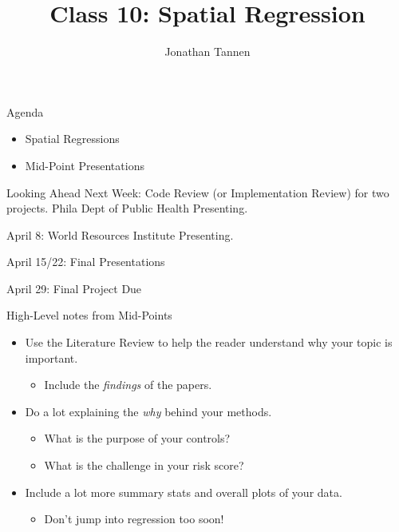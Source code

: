 \documentclass[
  8pt,
  ignorenonframetext,
]{beamer}
\title{Class 10: Spatial Regression}
\author{Jonathan Tannen}
\date{}
\providecommand{\tightlist}{%
  \setlength{\itemsep}{0pt}\setlength{\parskip}{0pt}}
\begin{document}
\frame{\titlepage}

\begin{frame}{Agenda}
\protect\hypertarget{agenda}{}
\begin{itemize}
\tightlist
\item
  Spatial Regressions
\item
  Mid-Point Presentations
\end{itemize}
\end{frame}

\begin{frame}{Looking Ahead}
\protect\hypertarget{looking-ahead}{}
Next Week: Code Review (or Implementation Review) for two projects.
Phila Dept of Public Health Presenting.

April 8: World Resources Institute Presenting.

April 15/22: Final Presentations

April 29: Final Project Due
\end{frame}

\begin{frame}{High-Level notes from Mid-Points}
\protect\hypertarget{high-level-notes-from-mid-points}{}
\begin{itemize}
\tightlist
\item
  Use the Literature Review to help the reader understand why your topic
  is important.

  \begin{itemize}
  \tightlist
  \item
    Include the \emph{findings} of the papers.
  \end{itemize}
\item
  Do a lot explaining the \emph{why} behind your methods.

  \begin{itemize}
  \tightlist
  \item
    What is the purpose of your controls?
  \item
    What is the challenge in your risk score?
  \end{itemize}
\item
  Include a lot more summary stats and overall plots of your data.

  \begin{itemize}
  \tightlist
  \item
    Don't jump into regression too soon!
  \end{itemize}
\end{itemize}
\end{frame}
\end{document}
